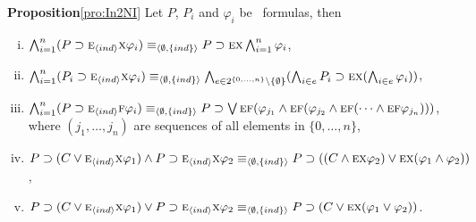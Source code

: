 \documentclass[letterpaper]{article}
\begin{document}
\noindent\textbf{Proposition}\ref{pro:In2NI}
Let $P$, $P_i$ and $\varphi_i$ be \CTL\ formulas, then
\begin{enumerate}[(i)]
  \item $\bigwedge_{i=1}^n (P\supset \textsc{e}_{{\langle{ind}\rangle}} \textsc{x} \varphi_i)  \equiv_{{\langle{\emptyset, \{ind\}}\rangle}} P\supset \textsc{e} \textsc{x} \bigwedge_{i=1}^n \varphi_i$,
  \item $\bigwedge_{i=1}^n (P_i\supset \textsc{e}_{{\langle{ind}\rangle}} \textsc{x} \varphi_i) \equiv_{{\langle{\emptyset, \{ind\}}\rangle}} \bigwedge_{e \in 2^{\{0,\dots, n\}} \setminus \{\emptyset\}}(\bigwedge_{i\in e}P_i\supset \textsc{e} \textsc{x} (\bigwedge_{i\in e}\varphi_i))$,
  \item $\bigwedge_{i=1}^n (P\supset \textsc{e}_{{\langle{ind}\rangle}} \textsc{f} \varphi_i)  \equiv_{{\langle{\emptyset, \{ind\}}\rangle}} P\supset \bigvee\textsc{e}\textsc{f} (\varphi_{j_1} \wedge \textsc{e}\textsc{f}(\varphi_{j_2} \wedge \textsc{e}\textsc{f}(\dots \wedge \textsc{e}\textsc{f} \varphi_{j_n})))$, where $(j_1, \dots, j_n)$ are sequences of all elements in $\{0, \dots, n\}$,
  \item $P\supset (C \vee \textsc{e}_{{\langle{ind}\rangle}} \textsc{x} \varphi_1) \wedge P \supset \textsc{e}_{{\langle{ind}\rangle}} \textsc{x} \varphi_2 \equiv_{{\langle{\emptyset, \{ind\}}\rangle}} P \supset ((C \wedge \textsc{e} \textsc{x} \varphi_2) \vee \textsc{e} \textsc{x} (\varphi_1 \wedge \varphi_2))$,
  \item $P\supset (C \vee \textsc{e}_{{\langle{ind}\rangle}} \textsc{x} \varphi_1) \vee P \supset \textsc{e}_{{\langle{ind}\rangle}} \textsc{x} \varphi_2 \equiv_{{\langle{\emptyset, \{ind\}}\rangle}} P \supset (C \vee \textsc{e} \textsc{x} (\varphi_1 \vee \varphi_2))$.
\end{enumerate}
\end{document}
